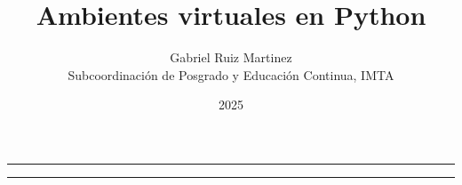 \documentclass{article}
\title{\textbf{Ambientes virtuales en Python}}
\date{2025}
\author{Gabriel Ruiz Martinez\\ Subcoordinación de Posgrado y Educación Continua, IMTA}
\begin{document}
\renewcommand{\contentsname}{Contenido} 

\maketitle
	
\vspace{0.25cm}
\hrule height 1pt

\tableofcontents
	
\vspace{0.25cm}
\hrule


\end{document}

